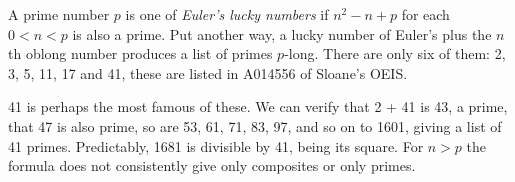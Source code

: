 \documentclass[12pt]{article}
\begin{document}

A prime number $p$ is one of {\em Euler's lucky numbers} if $n^2 - n + p$ for each $0 < n < p$ is also a prime. Put another way, a lucky number of Euler's plus the $n$th oblong number produces a list of primes $p$-long. There are only six of them: 2, 3, 5, 11, 17 and 41, these are listed in A014556 of Sloane's OEIS.

41 is perhaps the most famous of these. We can verify that 2 + 41 is 43, a prime, that 47 is also prime, so are 53, 61, 71, 83, 97, and so on to 1601, giving a list of 41 primes. Predictably, 1681 is divisible by 41, being its square. For $n > p$ the formula does not consistently give only composites or only primes.
\end{document}
